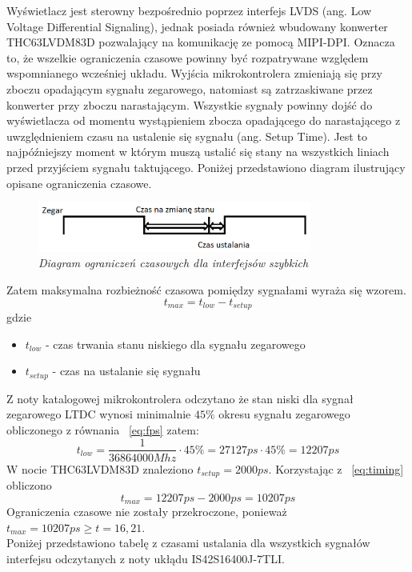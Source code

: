 \documentclass[eng,printmode]{mgr}
\begin{document}
Wyświetlacz jest sterowny bezpośrednio poprzez interfejs LVDS (ang. Low Voltage Differential Signaling), jednak  posiada również wbudowany konwerter THC63LVDM83D pozwalający na komunikację ze pomocą MIPI-DPI. Oznacza to, że wszelkie ograniczenia czasowe powinny być rozpatrywane względem wspomnianego wcześniej układu. 
\newpage
Wyjścia
mikrokontrolera zmieniają się przy zboczu opadającym sygnału zegarowego, natomiast są zatrzaskiwane przez konwerter przy zboczu narastającym. Wszystkie sygnały powinny dojść do wyświetlacza od momentu wystąpieniem zbocza opadającego do narastającego z uwzględnieniem czasu na ustalenie się sygnału (ang. Setup Time). Jest to najpóźniejszy moment w którym muszą ustalić się stany na wszystkich liniach przed przyjściem sygnału taktującego. Poniżej przedstawiono diagram ilustrujący opisane ograniczenia czasowe.

\begin{figure}[thb]
    \centering
    \includegraphics[width=9cm]{plots/timing.png}
    \caption{\textit{Diagram ograniczeń czasowych dla interfejsów szybkich}}
\end{figure}
\noindent
Zatem maksymalna rozbieżność czasowa pomiędzy sygnałami wyraża się wzorem.
\begin{equation}
t_{max} = t_{low}- t_{setup} \label{eq:timing}
\end{equation}
gdzie
\begin{itemize}
  \item \textbf{$t_{low}$} - czas trwania stanu niskiego dla sygnału zegarowego
  \item \textbf{$t_{setup}$} - czas na ustalanie się sygnału
\end{itemize}

Z noty katalogowej mikrokontrolera odczytano że stan niski dla sygnał zegarowego LTDC wynosi minimalnie $45\%$
okresu sygnału zegarowego obliczonego z równania ~\ref{eq:fps} zatem:
$$
t_{low} = \frac{1}{36864000Mhz} \cdot 45\% = 27127ps\cdot45\% = 12207ps
$$
W nocie THC63LVDM83D znaleziono $t_{setup} = 2000ps$. Korzystając z ~\ref{eq:timing} obliczono
$$
t_{max} = 12207ps - 2000ps = 10207ps
$$
Ograniczenia czasowe nie zostały przekroczone, ponieważ $t_{max}= 10207ps \geq t=16,21$.\\

Poniżej przedstawiono tabelę z czasami ustalania dla wszystkich sygnałów interfejsu odczytanych z noty ukłądu IS42S16400J-7TLI.
\end{document}
